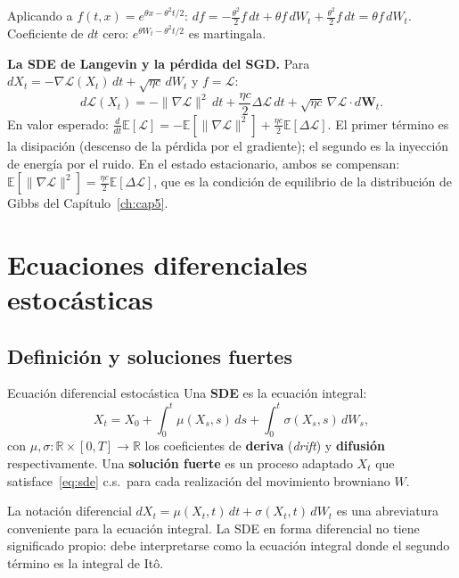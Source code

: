 Aplicando a $f(t,x) = e^{\theta x - \theta^2 t/2}$:
$df = -\frac{\theta^2}{2}f\,dt + \theta f\,dW_t + \frac{\theta^2}{2}f\,dt
= \theta f\,dW_t$. Coeficiente de $dt$ cero: $e^{\theta W_t - \theta^2 t/2}$
es martingala.

\medskip
\noindent\textbf{La SDE de Langevin y la pérdida del SGD.}
Para $dX_t = -\nabla\mathcal{L}(X_t)\,dt + \sqrt{\eta c}\,dW_t$ y
$f = \mathcal{L}$:
\[
  d\mathcal{L}(X_t) = -\|\nabla\mathcal{L}\|^2\,dt
  + \frac{\eta c}{2}\Delta\mathcal{L}\,dt
  + \sqrt{\eta c}\,\nabla\mathcal{L}\cdot d\bm{W}_t.
\]
En valor esperado: $\frac{d}{dt}\mathbb{E}[\mathcal{L}] = -\mathbb{E}
[\|\nabla\mathcal{L}\|^2] + \frac{\eta c}{2}\mathbb{E}[\Delta\mathcal{L}]$.
El primer término es la disipación (descenso de la pérdida por el gradiente);
el segundo es la inyección de energía por el ruido. En el estado estacionario,
ambos se compensan: $\mathbb{E}[\|\nabla\mathcal{L}\|^2] = \frac{\eta c}{2}
\mathbb{E}[\Delta\mathcal{L}]$, que es la condición de equilibrio de la
distribución de Gibbs del Capítulo~\ref{ch:cap5}.

\section{Ecuaciones diferenciales estocásticas}
\label{sec:sde}

\subsection{Definición y soluciones fuertes}
\label{subsec:sde_def}

\begin{definicion}{Ecuación diferencial estocástica}
\label{def:sde}
Una \textbf{SDE} es la ecuación integral:
\begin{equation}
  X_t = X_0 + \int_0^t \mu(X_s,s)\,ds + \int_0^t \sigma(X_s,s)\,dW_s,
  \label{eq:sde}
\end{equation}
con $\mu, \sigma: \mathbb{R}\times[0,T] \to \mathbb{R}$ los coeficientes de
\textbf{deriva} (\textit{drift}) y \textbf{difusión} respectivamente.
Una \textbf{solución fuerte} es un proceso adaptado $X_t$ que satisface~\eqref{eq:sde}
c.s.\ para cada realización del movimiento browniano $W$.
\end{definicion}

La notación diferencial $dX_t = \mu(X_t,t)\,dt + \sigma(X_t,t)\,dW_t$ es una
abreviatura conveniente para la ecuación integral. La SDE en forma diferencial
no tiene significado propio: debe interpretarse como la ecuación integral
donde el segundo término es la integral de Itô.

